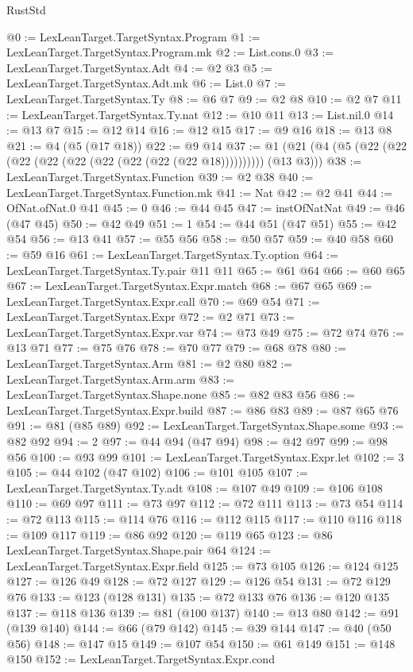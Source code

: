 \begin{lexlean}{RustStd}
\begin{coremodule}
@0 := LexLeanTarget.TargetSyntax.Program
@1 := LexLeanTarget.TargetSyntax.Program.mk
@2 := List.cons.{0}
@3 := LexLeanTarget.TargetSyntax.Adt
@4 := @2 @3
@5 := LexLeanTarget.TargetSyntax.Adt.mk
@6 := List.{0}
@7 := LexLeanTarget.TargetSyntax.Ty
@8 := @6 @7
@9 := @2 @8
@10 := @2 @7
@11 := LexLeanTarget.TargetSyntax.Ty.nat
@12 := @10 @11
@13 := List.nil.{0}
@14 := @13 @7
@15 := @12 @14
@16 := @12 @15
@17 := @9 @16
@18 := @13 @8
@21 := @4 (@5 (@17 @18))
@22 := @9 @14
@37 := @1 (@21 (@4 (@5 (@22 (@22 (@22 (@22 (@22 (@22 (@22 (@22 (@22 @18)))))))))) (@13 @3)))
@38 := LexLeanTarget.TargetSyntax.Function
@39 := @2 @38
@40 := LexLeanTarget.TargetSyntax.Function.mk
@41 := Nat
@42 := @2 @41
@44 := OfNat.ofNat.{0} @41
@45 := 0
@46 := @44 @45
@47 := instOfNatNat
@49 := @46 (@47 @45)
@50 := @42 @49
@51 := 1
@54 := @44 @51 (@47 @51)
@55 := @42 @54
@56 := @13 @41
@57 := @55 @56
@58 := @50 @57
@59 := @40 @58
@60 := @59 @16
@61 := LexLeanTarget.TargetSyntax.Ty.option
@64 := LexLeanTarget.TargetSyntax.Ty.pair @11 @11
@65 := @61 @64
@66 := @60 @65
@67 := LexLeanTarget.TargetSyntax.Expr.match
@68 := @67 @65
@69 := LexLeanTarget.TargetSyntax.Expr.call
@70 := @69 @54
@71 := LexLeanTarget.TargetSyntax.Expr
@72 := @2 @71
@73 := LexLeanTarget.TargetSyntax.Expr.var
@74 := @73 @49
@75 := @72 @74
@76 := @13 @71
@77 := @75 @76
@78 := @70 @77
@79 := @68 @78
@80 := LexLeanTarget.TargetSyntax.Arm
@81 := @2 @80
@82 := LexLeanTarget.TargetSyntax.Arm.arm
@83 := LexLeanTarget.TargetSyntax.Shape.none
@85 := @82 @83 @56
@86 := LexLeanTarget.TargetSyntax.Expr.build
@87 := @86 @83
@89 := @87 @65 @76
@91 := @81 (@85 @89)
@92 := LexLeanTarget.TargetSyntax.Shape.some
@93 := @82 @92
@94 := 2
@97 := @44 @94 (@47 @94)
@98 := @42 @97
@99 := @98 @56
@100 := @93 @99
@101 := LexLeanTarget.TargetSyntax.Expr.let
@102 := 3
@105 := @44 @102 (@47 @102)
@106 := @101 @105
@107 := LexLeanTarget.TargetSyntax.Ty.adt
@108 := @107 @49
@109 := @106 @108
@110 := @69 @97
@111 := @73 @97
@112 := @72 @111
@113 := @73 @54
@114 := @72 @113
@115 := @114 @76
@116 := @112 @115
@117 := @110 @116
@118 := @109 @117
@119 := @86 @92
@120 := @119 @65
@123 := @86 LexLeanTarget.TargetSyntax.Shape.pair @64
@124 := LexLeanTarget.TargetSyntax.Expr.field
@125 := @73 @105
@126 := @124 @125
@127 := @126 @49
@128 := @72 @127
@129 := @126 @54
@131 := @72 @129 @76
@133 := @123 (@128 @131)
@135 := @72 @133 @76
@136 := @120 @135
@137 := @118 @136
@139 := @81 (@100 @137)
@140 := @13 @80
@142 := @91 (@139 @140)
@144 := @66 (@79 @142)
@145 := @39 @144
@147 := @40 (@50 @56)
@148 := @147 @15
@149 := @107 @54
@150 := @61 @149
@151 := @148 @150
@152 := LexLeanTarget.TargetSyntax.Expr.cond

\end{coremodule}
\end{lexlean}
